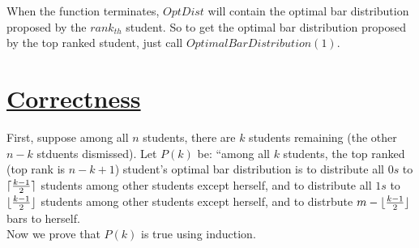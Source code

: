 \documentclass[11pt]{article}
\DeclarePairedDelimiter\ceil{\lceil}{\rceil}
\DeclarePairedDelimiter\floor{\lfloor}{\rfloor}
\begin{document}
When the function terminates, $OptDist$ will contain the optimal bar
distribution proposed by the $rank_{th}$ student. So to get the
optimal bar distribution proposed by the top ranked student, just call
$OptimalBarDistribution(1)$.

\section*{\underline{Correctness}}
First, suppose among all $n$ students, there are $k$ students
remaining (the other $n-k$ stduents dismissed). Let $P(k)$ be: ``among
all $k$ students, the top ranked (top rank is $n-k+1$) student's
optimal bar distribution is 
to distribute all $0s$ to $\ceil{\frac{k-1}{2}}$ students among other
students except herself, and to
distribute all $1s$ to $\floor{\frac{k-1}{2}}$ students among other
students except herself, and to distrbute $m-\floor{\frac{k-1}{2}}$ bars
to herself.\\
Now we prove that $P(k)$ is true using induction.
\end{document}
